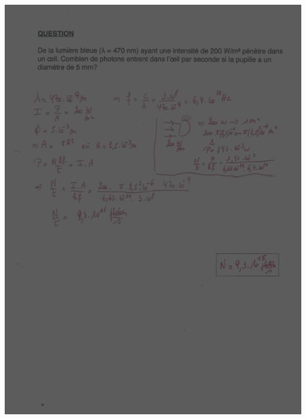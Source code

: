{{{\includegraphics[width=17.498cm,height=24.13cm]{Pictures/10000001000002570000033B1D8D222AA0515BC3.png}

}}}

